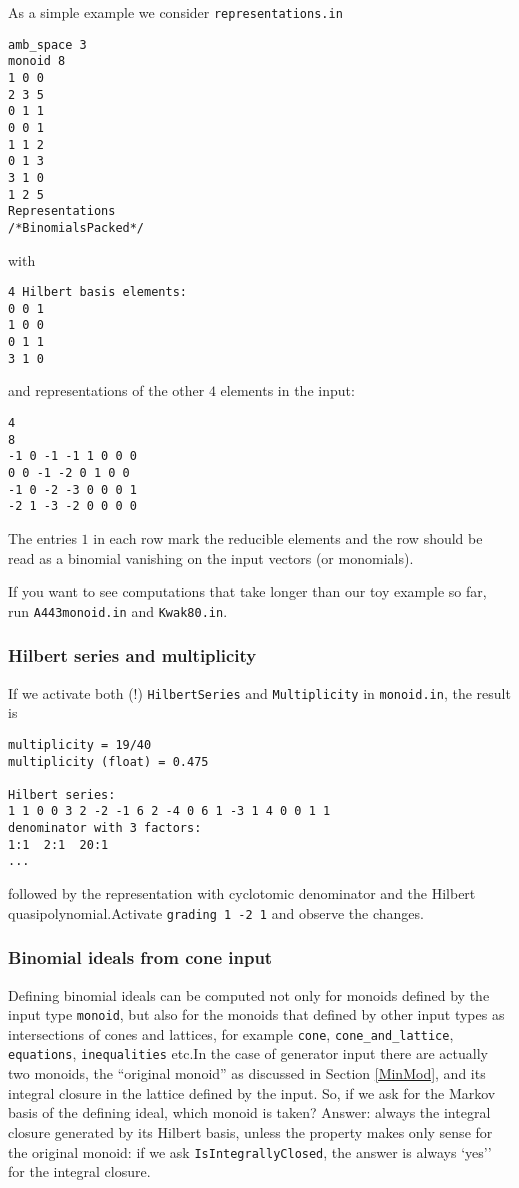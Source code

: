 As a simple example we consider \verb|representations.in|
\begin{Verbatim}
amb_space 3
monoid 8
1 0 0
2 3 5
0 1 1
0 0 1
1 1 2
0 1 3
3 1 0
1 2 5
Representations
/*BinomialsPacked*/
\end{Verbatim}
with
\begin{Verbatim}
4 Hilbert basis elements:
0 0 1
1 0 0
0 1 1
3 1 0
\end{Verbatim}
and representations of the other $4$ elements in the input:
\begin{Verbatim}
4
8
-1 0 -1 -1 1 0 0 0 
0 0 -1 -2 0 1 0 0 
-1 0 -2 -3 0 0 0 1 
-2 1 -3 -2 0 0 0 0
\end{Verbatim}
The entries $1$ in each row mark the reducible elements and the row should be read as a binomial vanishing on the input vectors (or monomials).

If you want to see computations that take longer than our toy example so far, run \verb|A443monoid.in| and \verb|Kwak80.in|.


\subsubsection{Hilbert series and multiplicity}

If we activate both (!) \verb|HilbertSeries| and \verb|Multiplicity| in \verb|monoid.in|, the result is
\begin{Verbatim}
multiplicity = 19/40
multiplicity (float) = 0.475

Hilbert series:
1 1 0 0 3 2 -2 -1 6 2 -4 0 6 1 -3 1 4 0 0 1 1 
denominator with 3 factors:
1:1  2:1  20:1 
... 
\end{Verbatim}
followed by the representation with cyclotomic denominator and the Hilbert quasipolynomial.Activate \verb|grading 1 -2 1| and observe the changes.



\subsubsection{Binomial ideals from cone input}

Defining binomial ideals can be computed not only for monoids defined by the input type \verb|monoid|, but also for the monoids that defined by other input types as intersections of cones and lattices, for example \verb|cone|, \verb|cone_and_lattice|, \verb|equations|, \verb|inequalities| etc.In the case of generator input there are actually two monoids, the ``original monoid'' as discussed in Section \ref{MinMod}, and its integral closure in the lattice defined by the input. So, if we ask for the Markov basis of the defining ideal, which monoid is taken? Answer: always the integral closure generated by its Hilbert basis, unless the property makes only sense for the original monoid: if we ask \verb|IsIntegrallyClosed|, the answer is always `yes''  for the integral closure.

